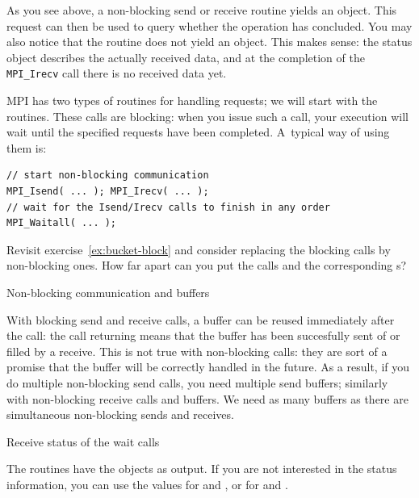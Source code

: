 As you see above, a non-blocking send or receive routine yields
an  object. This request can then be used to
query whether the operation has concluded. You may also notice that
the  routine does not 
yield an  object.
This makes sense: the status object
describes the actually received data, and at the completion of the
\lstinline$MPI_Irecv$ call there is no received data yet.

MPI has two types of routines for handling requests; we will start
with the  routines. These
calls are blocking: when you issue
such a call, your execution will wait until the specified requests
have been completed. A~typical way of using them is:
\begin{lstlisting}
// start non-blocking communication
MPI_Isend( ... ); MPI_Irecv( ... );
// wait for the Isend/Irecv calls to finish in any order
MPI_Waitall( ... );
\end{lstlisting}


\begin{exercise}
  \label{ex:bucket-nonblock}
  Revisit exercise~\ref{ex:bucket-block} and consider replacing the blocking
  calls by non-blocking ones. How far apart can you put the
   calls and the corresponding s?
\end{exercise}

 {Non-blocking communication and buffers}

With blocking send and receive calls, a buffer can be reused
immediately after the call: the call returning means that the buffer
has been succesfully sent of or filled by a receive. This is not true
with non-blocking calls: they are sort of a promise that the buffer
will be correctly handled in the future. As a result, if you do
multiple non-blocking send calls, you need multiple send buffers;
similarly with non-blocking receive calls and buffers.
We need as many buffers as there are
simultaneous non-blocking sends and receives.
%

 {Receive status of the wait calls}

The  routines have the 
objects as output.
If you are not interested in
the status information, you can use the values
 for  and
,
or  for 
and .

